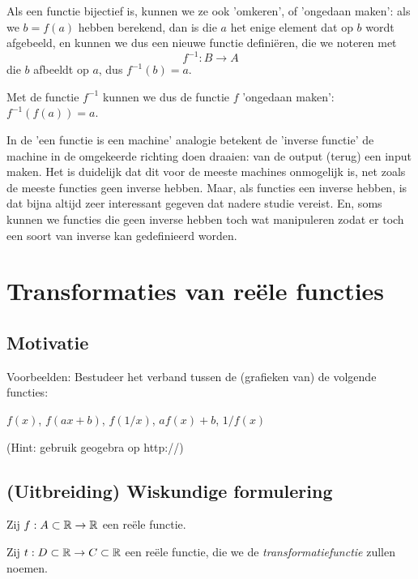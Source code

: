\documentclass{ximera}
\begin{document}
Als een functie bijectief is, kunnen we ze ook 'omkeren', of 'ongedaan maken': als we $b=f(a)$ hebben berekend, dan is die $a$ het enige element dat op $b$ wordt afgebeeld, en kunnen we dus een nieuwe functie definiëren, die we noteren met 
$$f^{-1}: B \rightarrow A$$ 
die $b$ afbeeldt op $a$, dus $f^{-1}(b) = a$.

Met de functie $f^{-1}$ kunnen we dus de functie $f$ 'ongedaan maken': $f^{-1}(f(a)) = a$.

In de 'een functie is een machine' analogie betekent de 'inverse functie' de machine in de omgekeerde richting doen draaien: van de output (terug) een input maken. Het is duidelijk dat dit voor de meeste machines onmogelijk is, net zoals de meeste functies geen inverse hebben. Maar, als functies een inverse hebben, is dat bijna altijd zeer interessant gegeven dat nadere studie vereist. En, soms kunnen we functies die geen inverse hebben toch wat manipuleren zodat er toch een soort van inverse kan gedefinieerd worden.

\section{Transformaties van reële functies}

\subsection{Motivatie}

Voorbeelden: Bestudeer het verband tussen de (grafieken van) de volgende functies: 

$f(x)$, $f(ax+b)$, $f(1/x)$, $af(x)+b$, $1/f(x)$


(Hint: gebruik geogebra op http://)

\subsection{(Uitbreiding) Wiskundige formulering}

Zij $f:A\subset\mathbb{R}\to \mathbb{R}$ een reële functie.

Zij $t:D \subset\mathbb{R} \to C\subset\mathbb{R}$ een reële functie, die we de \textit{transformatiefunctie} zullen noemen.
\end{document}
